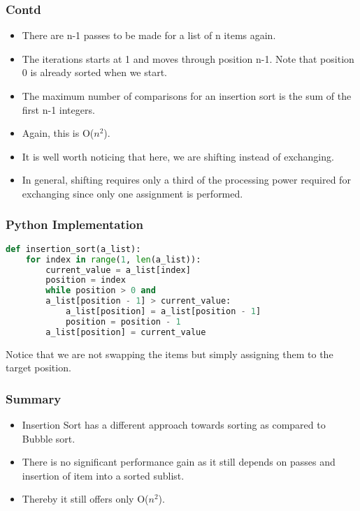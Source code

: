 \documentclass{beamer}
\begin{document}
\begin{frame}
\frametitle{Contd}
\begin{itemize}
\item There are n-1 passes to be made for a list of n items again.
\item The iterations starts at 1 and moves through position n-1. Note that position 0 is already sorted when we start.
\item The maximum number of comparisons for an insertion sort is the sum of the first n-1 integers.
\item Again, this is O($n^2$).
\item It is well worth noticing that here, we are shifting instead of exchanging. 
\item In general, shifting requires only a third of the processing power required for exchanging since only one assignment is performed. 
\end{itemize}
\end{frame}

\begin{frame}[fragile]
\frametitle{Python Implementation}
\begin{lstlisting}[language=Python]
def insertion_sort(a_list):
    for index in range(1, len(a_list)):
        current_value = a_list[index]
        position = index
        while position > 0 and 
        a_list[position - 1] > current_value:
            a_list[position] = a_list[position - 1]
            position = position - 1
        a_list[position] = current_value
\end{lstlisting}
Notice that we are not swapping the items but simply assigning them to the target position.
\end{frame}

\begin{frame}
\frametitle{Summary}
\begin{itemize}
\item Insertion Sort has a different approach towards sorting as compared to Bubble sort.
\item There is no significant performance gain as it still depends on passes and insertion of item into a sorted sublist.
\item Thereby it still offers only O($n^2$).
\end{itemize}
\end{frame}
\end{document}
